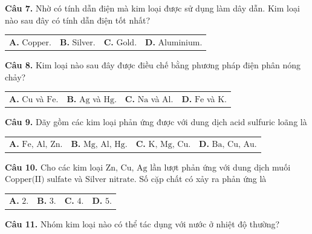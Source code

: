 \documentclass{article}
\begin{document}
\fontsize{26}{34}\selectfont
\textbf{Câu 7.} Nhờ có tính dẫn điện mà kim loại được sử dụng làm dây dẫn. Kim loại nào sau đây có tính dẫn điện tốt nhất?
\vspace{6pt}

\begin{tabularx}{\linewidth}{@{}X X X X@{}}
\textbf{A.} Copper. & \textbf{B.} Silver. & \textbf{C.} Gold. & \textbf{D.} Aluminium.
\end{tabularx}

\vspace*{\fill}

\textbf{Câu 8.} Kim loại nào sau đây được điều chế bằng phương pháp điện phân nóng chảy?
\vspace{6pt}

\begin{tabularx}{\linewidth}{@{}X X X X@{}}
\textbf{A.} $\text{Cu}$ và $\text{Fe}$. & \textbf{B.} $\text{Ag}$ và $\text{Hg}$. & \textbf{C.} $\text{Na}$ và $\text{Al}$. & \textbf{D.} $\text{Fe}$ và $\text{K}$.
\end{tabularx}
\vspace*{\fill}
\newpage

\fontsize{26}{34}\selectfont
\textbf{Câu 9.} Dãy gồm các kim loại phản ứng được với dung dịch acid sulfuric loãng là
\vspace{6pt}

\begin{tabularx}{\linewidth}{@{}X X X X@{}}
\textbf{A.} $\text{Fe, Al, Zn}$. & \textbf{B.} $\text{Mg, Al, Hg}$. & \textbf{C.} $\text{K, Mg, Cu}$. & \textbf{D.} $\text{Ba, Cu, Au}$.
\end{tabularx}

\vspace*{\fill}

\textbf{Câu 10.} Cho các kim loại $\text{Zn, Cu, Ag}$ lần lượt phản ứng với dung dịch muối $\text{Copper(II) sulfate}$ và $\text{Silver nitrate}$. Số cặp chất có xảy ra phản ứng là
\vspace{6pt}

\begin{tabularx}{\linewidth}{@{}X X X X@{}}
\textbf{A.} $2$. & \textbf{B.} $3$. & \textbf{C.} $4$. & \textbf{D.} $5$.
\end{tabularx}
\vspace*{\fill}
\newpage

\fontsize{26}{34}\selectfont
\textbf{Câu 11.} Nhóm kim loại nào có thể tác dụng với nước ở nhiệt độ thường?
\vspace{6pt}
\end{document}
